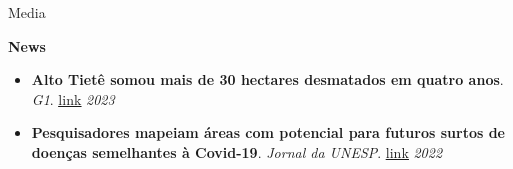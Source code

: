 \documentclass{resume}
\begin{document}
\begin{rSection}{Media}

{\bf News}
\begin{itemize} 
\item {\bf Alto Tietê somou mais de 30 hectares desmatados em quatro anos}. {\it G1}. \href{https://g1.globo.com/sp/mogi-das-cruzes-suzano/noticia/2023/06/05/em-quatro-anos-alto-tiete-somou-mais-de-30-hectares-desmatados.ghtml}{\underline{link}} \hfill{\em 2023}
\item {\bf Pesquisadores mapeiam áreas com potencial para futuros surtos de doenças semelhantes à Covid-19}. {\it Jornal da UNESP}. \href{https://jornal.unesp.br/2022/06/23/pesquisadores-mapeiam-areas-com-potencial-para-futuros-surtos-de-doencas-semelhantes-a-covid-19/}{\underline{link}} \hfill{\em 2022}
\end{itemize} 


\end{rSection}
\end{document}
